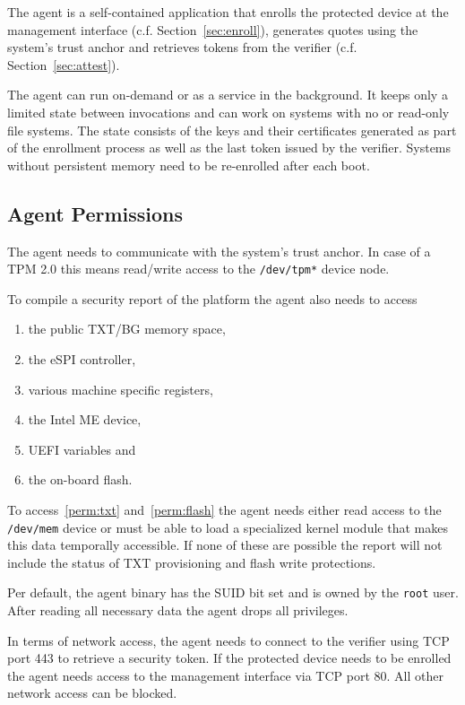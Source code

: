\documentclass[a4paper,oneside,10pt,extrafontsizes]{memoir}
\begin{document}
The agent is a self-contained application that enrolls the protected device at
the management interface (c.f. Section~\ref{sec:enroll}), generates quotes
using the system's trust anchor and retrieves tokens from the verifier (c.f.
Section~\ref{sec:attest}).

The agent can run on-demand or as a service in the background. It keeps
only a limited state between invocations and can work on systems with no or
read-only file systems. The state consists of the keys and their certificates
generated as part of the enrollment process as well as the last token issued by
the verifier. Systems without persistent memory need to be re-enrolled after
each boot. 

\subsection*{Agent Permissions}

The agent needs to communicate with the system's trust anchor. In case
of a TPM 2.0 this means read/write access to the \texttt{/dev/tpm*} device
node. 

To compile a security report of the platform the agent also needs to
access

\begin{enumerate}
    \item \label{perm:txt} the public TXT/BG memory space,
    \item the eSPI controller,
    \item various machine specific registers,
    \item the Intel ME device,
    \item UEFI variables and
    \item \label{perm:flash} the on-board flash.
\end{enumerate}

To access~\ref{perm:txt} and~\ref{perm:flash} the agent needs either
read access to the \texttt{/dev/mem} device or must be able to load a
specialized kernel module that makes this data temporally accessible. If none of
these are possible the report will not include the status of TXT provisioning
and flash write protections.

Per default, the agent binary has the SUID bit set and is owned by the
\texttt{root} user. After reading all necessary data the agent drops all
privileges.

In terms of network access, the agent needs to connect to the verifier using TCP
port 443 to retrieve a security token. If the protected device needs to be
enrolled the agent needs access to the management interface via TCP port 80.
All other network access can be blocked.
\end{document}
